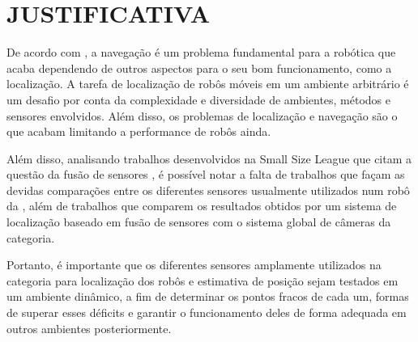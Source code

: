 \documentclass[acronym, symbols, table, deposito]{fei}
\begin{document}
%		
%		
%		
		
	\section{JUSTIFICATIVA}
	
		De acordo com \textcite{alatise2020review}, a navegação é um problema fundamental para a robótica que acaba dependendo de outros aspectos para o seu bom funcionamento, como a localização. A tarefa de localização de robôs móveis em um ambiente arbitrário é um desafio por conta da complexidade e diversidade de ambientes, métodos e sensores envolvidos. Além disso, os problemas de localização e navegação são o que acabam limitando a performance de robôs ainda.
		
		Além disso, analisando trabalhos desenvolvidos na Small Size League que citam a questão da fusão de sensores \cite{Ryll2013TIGERSM, ubc_thunderbots_2017, parsian_2015, parsian_2019, mrl_2020, ubc_thunderbots_2015, immortals_2023}, é possível notar a falta de trabalhos que façam as devidas comparações entre os diferentes sensores usualmente utilizados num robô da , além de trabalhos que comparem os resultados obtidos por um sistema de localização baseado em fusão de sensores com o sistema global de câmeras da categoria.
		
		Portanto, é importante que os diferentes sensores amplamente utilizados na categoria  para localização dos robôs e estimativa de posição sejam testados em um ambiente dinâmico, a fim de determinar os pontos fracos de cada um, formas de superar esses déficits e garantir o funcionamento deles de forma adequada em outros ambientes posteriormente.
	
\end{document}
